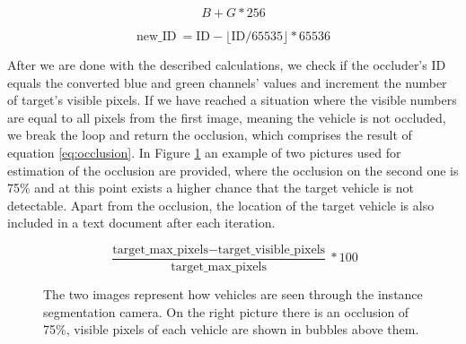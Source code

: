 \begin{equation}B + G * 256\label{eq:instance}\end{equation}

\begin{equation}\textrm{new\_ID} \: = \textrm{ID} - \lfloor \textrm{ID} / 65535 \rfloor * 65536\label{eq:new_id}\end{equation}

After we are done with the described calculations, we check if the occluder's ID equals the converted blue and green channels' values and increment the number of target's visible pixels. If we have reached a situation where the visible numbers are equal to all pixels from the first image, meaning the vehicle is not occluded, we break the loop and return the occlusion, which comprises the result of equation \ref{eq:occlusion}. In Figure \ref{fig:occlusion_calc} an example of two pictures used for estimation of the occlusion are provided, where the occlusion on the second one is 75\% and at this point exists a higher chance that the target vehicle is not detectable. Apart from the occlusion, the location of the target vehicle is also included in a text document after each iteration. 

\begin{equation}
    \frac{\textrm{target\_max\_pixels} - \textrm{target\_visible\_pixels}}{\textrm{target\_max\_pixels}} * 100 \label{eq:occlusion}
\end{equation}

\begin{figure} [h!]
  \centering
  \hfill
  \caption[Calculation of an occlusion]{The two images represent how vehicles are seen through the instance segmentation camera. On the right picture there is an occlusion of 75\%, visible pixels of each vehicle are shown in bubbles above them.} \label{fig:occlusion_calc}
\end{figure}
 
